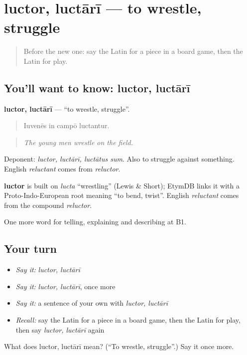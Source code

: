 \section[luctor, luctārī]{luctor, luctārī — to wrestle, struggle}

\label{lesson:LA-C539-luctor}



\begin{quote}
Before the new one: say the Latin for a piece in a board game, then the Latin for play.
\end{quote}

\subsection*{You'll want to know: luctor, luctārī}
\textbf{luctor, luctārī} — \textquotedblleft{}to wrestle, struggle\textquotedblright{}.

\begin{quote}
Iuvenēs in campō luctantur.
\end{quote}

\begin{quote}
\emph{The young men wrestle on the field.}
\end{quote}

Deponent: \emph{luctor, luctārī, luctātus sum}. Also to struggle against something. English \emph{reluctant} comes from \emph{reluctor}.

\begin{cousinweb}
\textbf{luctor} is built on \emph{lucta} \textquotedblleft{}wrestling\textquotedblright{} (Lewis \& Short); EtymDB links it with a Proto-Indo-European root meaning \textquotedblleft{}to bend, twist\textquotedblright{}. English \emph{reluctant} comes from the compound \emph{reluctor}.
\end{cousinweb}

\begin{grammarlens}[title={What you've built}]
One more word for telling, explaining and describing at B1.
\end{grammarlens}

\subsection*{Your turn}
\begin{itemize}
\raggedright
  \item \emph{Say it:} \emph{luctor, luctārī}
  \item \emph{Say it:} \emph{luctor, luctārī}, once more
  \item \emph{Say it:} a sentence of your own with \emph{luctor, luctārī}
  \item \emph{Recall:} say the Latin for a piece in a board game, then the Latin for play, then say \emph{luctor, luctārī} again
\end{itemize}

\begin{tcolorbox}[breakable,colback=teal!4,colframe=teal!35!black,title={Before you move on}]
What does luctor, luctārī mean? (\textquotedblleft{}To wrestle, struggle\textquotedblright{}.) Say it once more.
\end{tcolorbox}
